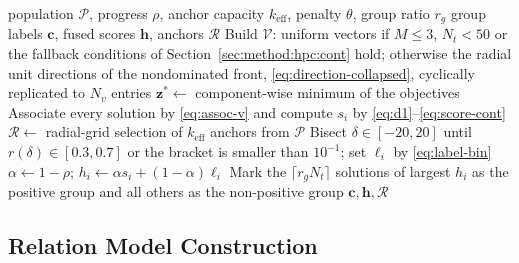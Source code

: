 \documentclass[11pt,a4paper]{article}
\newcommand{\vz}{\mathbf{z}}
\newcommand{\keff}{k_{\mathrm{eff}}}
\begin{document}
\begin{algorithm}[t]
\caption{Hybrid PBI quality stratification}
\label{alg:hpc}
\begin{algorithmic}[1]
\Require population $\mathcal{P}$, progress $\rho$, anchor capacity $\keff$,
         penalty $\theta$, group ratio $r_g$
\Ensure group labels $\bm{c}$, fused scores $\bm{h}$, anchors $\mathcal{R}$
\State Build $\mathcal{V}$: uniform vectors if $M\leq3$, $N_t<50$ or the
       fallback conditions of Section~\ref{sec:method:hpc:cont} hold; otherwise
       the radial unit directions of the nondominated front,
       \eqref{eq:direction-collapsed}, cyclically replicated to $N_v$ entries
\State $\vz^{*}\gets$ component-wise minimum of the objectives
\State Associate every solution by \eqref{eq:assoc-v} and compute $s_i$ by
       \eqref{eq:d1}--\eqref{eq:score-cont}
\State $\mathcal{R}\gets$ radial-grid selection of $\keff$ anchors from
       $\mathcal{P}$
\State Bisect $\delta\in[-20,20]$ until $r(\delta)\in[0.3,0.7]$ or the bracket
       is smaller than $10^{-1}$; set $\ell_i$ by \eqref{eq:label-bin}
\State $\alpha\gets1-\rho$;
       $h_i\gets\alpha s_i+(1-\alpha)\ell_i$
\State Mark the $\lceil r_gN_t\rceil$ solutions of largest $h_i$ as the positive
       group and all others as the non-positive group
\State \Return $\bm{c},\bm{h},\mathcal{R}$
\end{algorithmic}
\end{algorithm}

\subsection{Relation Model Construction}
\label{sec:method:relation}
\end{document}
